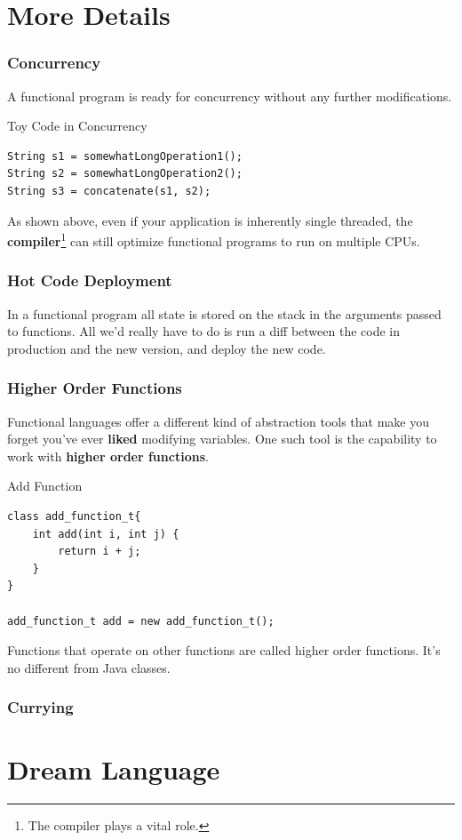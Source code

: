 \documentclass[12pt,hyperref=true,mathserif]{beamer}
\begin{document}
\section{More Details}


\begin{frame}
  \frametitle{Concurrency}
A functional program is ready for concurrency without any further
modifications.
\begin{block}{Toy Code in Concurrency}
\begin{verbatim}
String s1 = somewhatLongOperation1();
String s2 = somewhatLongOperation2();
String s3 = concatenate(s1, s2);
\end{verbatim}
\end{block}
As shown above, even if your application is inherently single
threaded, the \textbf{compiler}\footnote{The compiler plays a vital role.} can still optimize
functional programs to run on multiple CPUs.
\end{frame}

\begin{frame}
  \frametitle{Hot Code Deployment}
In a functional program all state is stored on the stack in the
arguments passed to functions. All we'd really have to do is run a
diff between the code in production and the new version, and deploy
the new code.

\end{frame}

\begin{frame}
  \frametitle{Higher Order Functions}
Functional languages offer a different kind of abstraction tools that
make you forget you've ever \textbf{liked} modifying variables. One such
tool is the capability to work with \textbf{higher order functions}.
\begin{block}{Add Function}
\begin{verbatim}
class add_function_t{
    int add(int i, int j) {
        return i + j;
    }
}

add_function_t add = new add_function_t();
\end{verbatim}
\end{block}
Functions that operate on other functions are called higher order
functions. It's no different from Java classes.
\end{frame}

\begin{frame}
  \frametitle{Currying}

\end{frame}


\section{Dream Language}


\begin{frame}
% 
% 
\end{frame}
\end{document}
